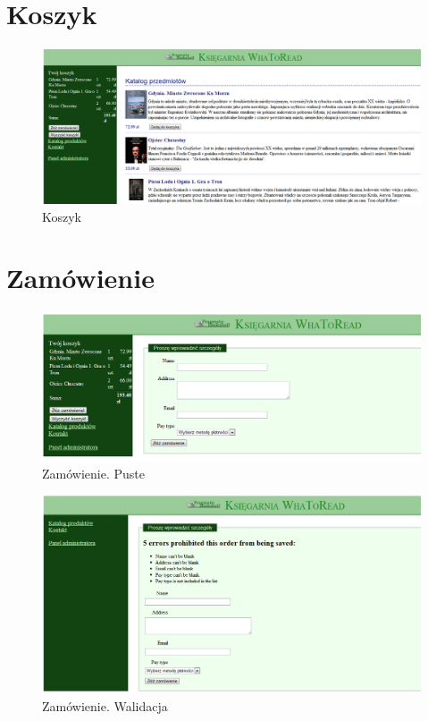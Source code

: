 \documentclass[pdflatex,11pt]{aghdpl}
\begin{document}
\clearpage


\section{Koszyk}

\begin{figure}[!h]
\centering
\includegraphics[width=\textwidth]{koszyk}
\caption{Koszyk}
\label{fig:koszyk}
\end{figure}


\section{Zamówienie}

\begin{figure}[!h]
\centering
\includegraphics[width=\textwidth]{zamowienie_puste}
\caption{Zamówienie. Puste}
\label{fig:zamowienie_puste}
\end{figure}

\clearpage


\begin{figure}[!h]
\centering
\includegraphics[width=\textwidth]{zamowienie_walidacja}
\caption{Zamówienie. Walidacja}
\label{fig:zamowienie_walidacja}
\end{figure}
\end{document}

